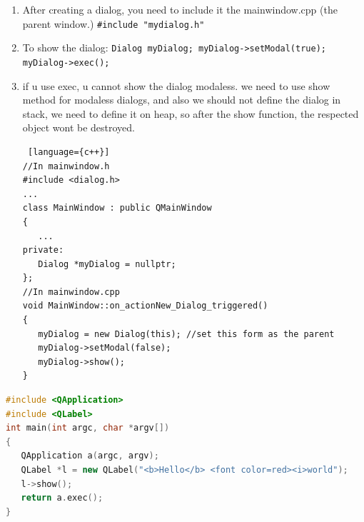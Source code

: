 \begin{note}[Dialogs]
\begin{enumerate}
\item After creating a dialog, you need to include it the mainwindow.cpp (the parent window.) \verb|#include "mydialog.h"|
\item To show the dialog:
\verb|Dialog myDialog; myDialog->setModal(true); myDialog->exec();|
\item if u use exec, u cannot show the dialog modaless. we need to use show method for modaless dialogs, and also we should not define the dialog in stack, we need to define it on heap, so after the show function, the respected object wont be destroyed.
\begin{lstlisting} [language={c++}]
//In mainwindow.h
#include <dialog.h>
...
class MainWindow : public QMainWindow
{
   ...
private:
   Dialog *myDialog = nullptr;
};
//In mainwindow.cpp
void MainWindow::on_actionNew_Dialog_triggered()
{
   myDialog = new Dialog(this); //set this form as the parent
   myDialog->setModal(false);
   myDialog->show();
}
\end{lstlisting}
\end{enumerate}
\end{note}

\begin{note}
\begin{lstlisting}[language = {c++}]
#include <QApplication>
#include <QLabel>
int main(int argc, char *argv[])
{
   QApplication a(argc, argv);
   QLabel *l = new QLabel("<b>Hello</b> <font color=red><i>world");
   l->show();
   return a.exec();
}
\end{lstlisting}
\end{note}

